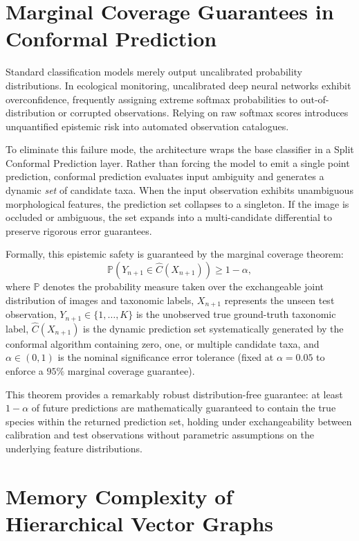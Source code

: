 \section{Marginal Coverage Guarantees in Conformal Prediction}
\label{sec:conformal_math}

Standard classification models merely output uncalibrated probability distributions. In ecological monitoring, uncalibrated deep neural networks exhibit overconfidence, frequently assigning extreme softmax probabilities to out-of-distribution or corrupted observations. Relying on raw softmax scores introduces unquantified epistemic risk into automated observation catalogues.

To eliminate this failure mode, the architecture wraps the base classifier in a Split Conformal Prediction layer. Rather than forcing the model to emit a single point prediction, conformal prediction evaluates input ambiguity and generates a dynamic \textit{set} of candidate taxa. When the input observation exhibits unambiguous morphological features, the prediction set collapses to a singleton. If the image is occluded or ambiguous, the set expands into a multi-candidate differential to preserve rigorous error guarantees.

Formally, this epistemic safety is guaranteed by the marginal coverage theorem:
\[
\mathbb{P}\left(Y_{n+1} \in \hat{C}(X_{n+1})\right) \ge 1 - \alpha,
\]
where $\mathbb{P}$ denotes the probability measure taken over the exchangeable joint distribution of images and taxonomic labels, $X_{n+1}$ represents the unseen test observation, $Y_{n+1} \in \{1, \dots, K\}$ is the unobserved true ground-truth taxonomic label, $\hat{C}(X_{n+1})$ is the dynamic prediction set systematically generated by the conformal algorithm containing zero, one, or multiple candidate taxa, and $\alpha \in (0, 1)$ is the nominal significance error tolerance (fixed at $\alpha = 0.05$ to enforce a $95\%$ marginal coverage guarantee).

This theorem provides a remarkably robust distribution-free guarantee: at least $1 - \alpha$ of future predictions are mathematically guaranteed to contain the true species within the returned prediction set, holding under exchangeability between calibration and test observations without parametric assumptions on the underlying feature distributions.

\section{Memory Complexity of Hierarchical Vector Graphs}
\label{sec:hnsw_memory}

